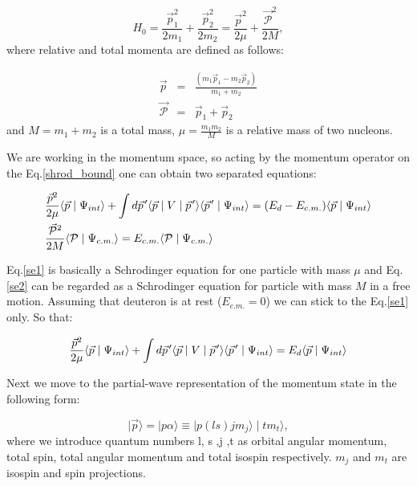     \begin{equation}
        H_0 = \frac{\vec{p}_1^2}{2m_1} + \frac{\vec{p}_2^2}{2m_2} = 
        \frac{\vec{p}^2}{2\mu} + \frac{\vec{\mathcal{P}}^2}{2M}, 
    \end{equation}
    where relative and total momenta are defined as follows:

    \begin{eqnarray}
        \vec{p} &=& \frac{(m_1\vec{p}_1 - m_2\vec{p}_2)}{m_1 + m_2}\\
        \vec{\mathcal{P}} &=& \vec{p}_1 + \vec{p}_2
    \end{eqnarray}
    and $M = m_1 + m_2$ is a total mass, $\mu = \frac{m_1m_2}{M}$ is a relative mass of two nucleons.

    We are working in the momentum space, so acting by the momentum operator
    on the Eq.\ref*{shrod_bound} one can obtain two separated equations:

    \begin{eqnarray}
        &\frac{\vec{p}^2}{2\mu} \langle \vec{p} \mid \Psi_{int} \rangle +
        \int d \pvec{p}^\prime \langle \vec{p} \mid V \mid \pvec{p}^\prime \rangle
        \langle \pvec{p}^\prime \mid \Psi_{int} \rangle = 
        (E_d - E_{c.m.})\langle \vec{p} \mid \Psi_{int} \rangle \label{se1}\\
        &\frac{\vec{\mathcal{P}}^2}{2M} \langle \mathcal{P} \mid \Psi_{c.m.} \rangle = 
        E_{c.m.}\langle \mathcal{P} \mid \Psi_{c.m.} \rangle \label{se2}
    \end{eqnarray}

    Eq.\ref{se1} is basically a Schrodinger equation for one particle with mass $\mu$ 
    and Eq.\ref{se2} can be regarded as a Schrodinger equation for particle with mass $M$ in 
    a free motion. Assuming that deuteron is at rest ($E_{c.m.} = 0$) we can stick 
    to the Eq.\ref{se1} only. So that:

    \begin{equation}
        \frac{\vec{p}^2}{2\mu} \langle \vec{p} \mid \Psi_{int} \rangle +
        \int d \pvec{p}^\prime \langle \vec{p} \mid V \mid \pvec{p}^\prime \rangle
        \langle \pvec{p}^\prime \mid \Psi_{int} \rangle = 
        E_d \langle \vec{p} \mid \Psi_{int} \rangle
        \label{shrod_old}
    \end{equation}

    Next we move to the partial-wave representation of the momentum state in the following form:

    \begin{equation}
        \mid \vec{p} \rangle = \mid p \alpha \rangle \equiv \mid p (ls) j m_j \rangle \mid t m_t \rangle,
        \label{pwmain}
    \end{equation}
    where we introduce quantum numbers l, s ,j ,t as orbital angular momentum, total spin,
    total angular momentum and total isospin respectively. $m_j$ and $m_t$ are isospin
    and spin projections.


